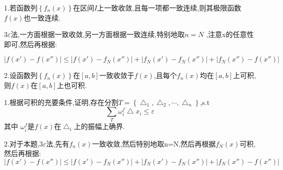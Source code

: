 \documentclass{ctexart}
\begin{document}
\begin{tcolorbox}[title = {综合性问题及其思路,无解析答案},colbacktitle=red!25!white,colback=white,arc = 2mm, outer arc = 2mm,fonttitle = \itshape, fontupper = \itshape, fontlower = \itshape]
	1.若函数列$\left\{f_{n}(x)\right\}$在区间$I$上一致收敛,且每一项都一致连续,则其极限函数$f(x)$也一致连续.
	\begin{tcolorbox}[colback=white,arc = 1mm, outer arc = 1mm,fonttitle = \itshape, fontupper = \itshape, fontlower = \itshape]
     {\color{red}$3\varepsilon$法,一方面根据一致收敛,另一方面根据一致连续,特别地取$n=N$ ,注意x的任意性即可,然后再根据:}
     
     $$\left |f(x')-f(x'')\right |\le \left |f(x')-f_{N}(x'') \right |+\left |f_{N}(x')-f_{N}(x'')\right |+\left |f_{N}(x'')-f(x'')  \right | $$
     \tcblower
      \vspace{210pt}
	\end{tcolorbox}
  
	  
	2.设函数列$\left\{f_{n}(x)\right\}$在$\left[a,b\right]$一致收敛于$f(x)$,且每个$f_{n}(x)$均在$\left[a,b\right]$上可积,则$f(x)$在$\left[a,b\right]$上也可积.
	\begin{tcolorbox}[colback=white,arc = 1mm, outer arc = 1mm,fonttitle = \itshape, fontupper = \itshape, fontlower = \itshape]
     {\color{red} 1.根据可积的充要条件,证明,存在分割$T=\left\{\bigtriangleup_{1},\bigtriangleup_{2},\cdots,\bigtriangleup_{n}\right\}$,s.t$$\sum_{T}\omega_{i}^{f}\bigtriangleup x_{i} \le \varepsilon$$
      其中 $\omega_{i}^{f}$是$f(x)$在$\bigtriangleup_{i}$上的振幅上确界.}
      
      2.对于本题,$3\varepsilon$法,先有$f_{n}(x)$一致收敛,然后特别地取n=N,然后再根据$f_{N}(x)$可积,然后再根据:
      $$\left |f(x')-f(x'')\right |\le \left |f(x')-f_{N}(x'') \right |+\left |f_{N}(x')-f_{N}(x'')\right |+\left |f_{N}(x'')-f(x'')  \right | $$
        \tcblower
      \vspace{200pt}
	\end{tcolorbox}

      
\end{tcolorbox}
\end{document}
